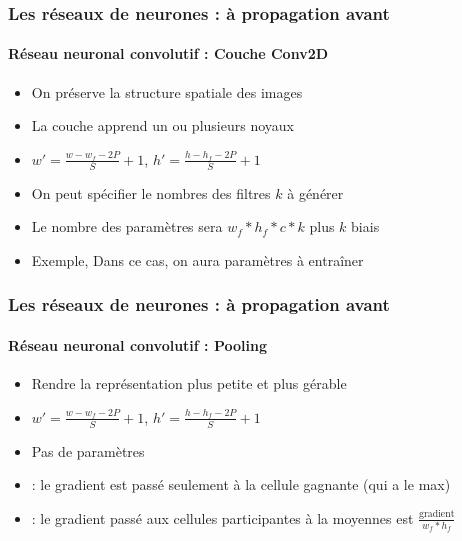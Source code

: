 \documentclass[xcolor=table]{beamer}
\begin{document}
\begin{frame}
\frametitle{Les réseaux de neurones : à propagation avant}
\framesubtitle{Réseau neuronal convolutif : Couche Conv2D}

\begin{minipage}{0.60\textwidth} 
	\begin{itemize}
		\item On préserve la structure spatiale des images
		\item La couche apprend un ou plusieurs noyaux
		\item $ w' = \frac{w - w_f - 2P}{S} + 1$,  $ h' = \frac{h - h_f - 2P}{S} + 1$
		\item On peut spécifier le nombres des filtres $k$ à générer 
		\item Le nombre des paramètres sera $w_f * h_f * c * k$ plus $k$ biais
		\item Exemple,  Dans ce cas, on aura  paramètres à entraîner
	\end{itemize}
\end{minipage}
%
\begin{minipage}{0.39\textwidth}
	
\end{minipage}

\end{frame}

\begin{frame}
\frametitle{Les réseaux de neurones : à propagation avant}
\framesubtitle{Réseau neuronal convolutif : Pooling}

\begin{minipage}{0.60\textwidth} 
	\begin{itemize}
		\item Rendre la représentation plus petite et plus gérable
		\item $ w' = \frac{w - w_f - 2P}{S} + 1$,  $ h' = \frac{h - h_f - 2P}{S} + 1$
		\item Pas de paramètres 
		\item {} : le gradient est passé seulement à la cellule gagnante (qui a le max) 
		\item {} : le gradient passé aux cellules participantes à la moyennes est $\frac{\text{gradient}}{w_f * h_f}$ 
	\end{itemize}
\end{minipage}
%
\begin{minipage}{0.39\textwidth}
	
\end{minipage}

\end{frame}
\end{document}
